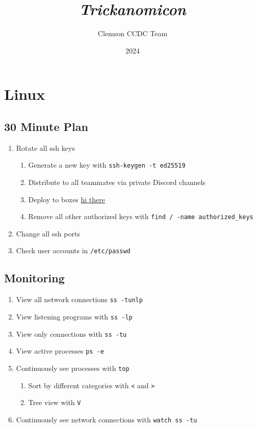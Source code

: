 \documentclass[12pt,letterpaper]{article}
\title{\huge{\textit{Trickanomicon}}}
\author{Clemson CCDC Team}
\date{2024}
\def\code#1{\textcolor{c2}{\texttt{#1}}}
\begin{document}
\maketitle

\pagebreak

\tableofcontents

\pagebreak

\section{Linux}

\subsection{30 Minute Plan}

\begin{enumerate}
	\item Rotate all ssh keys
		\begin{enumerate}
			\item Generate a new key with \code{ssh-keygen -t ed25519}
			\item Distribute to all teammates via private Discord channels
			\item Deploy to boxes \hyperref[sec:Monitoring]{hi there}
			\item Remove all other authorized keys with \code{find / -name authorized\_keys}
		\end{enumerate}
	\item Change all ssh ports
	\item Check user accounts in \code{/etc/passwd}
\end{enumerate}

\subsection{Monitoring}
\label{sec:Monitoring}

\begin{enumerate}
	\item View all network connections \code{ss -tunlp}
	\item View listening programs with \code{ss -lp}
	\item View only connections with \code{ss -tu}
	\item View active processes \code{ps -e}
	\item Continuously see processes with \code{top}
		\begin{enumerate}
			\item Sort by different categories with \code{<} and \code{>}
			\item Tree view with \code{V}
		\end{enumerate}
	\item Continuously see network connections with \code{watch ss -tu}
\end{enumerate}
\end{document}
